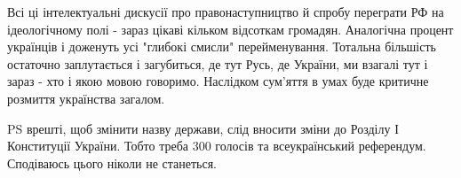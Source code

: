 Всі ці інтелектуальні дискусії про правонаступництво й спробу переграти РФ на
ідеологічному полі - зараз цікаві кільком відсоткам громадян. Аналогічна
процент українців і доженуть усі "глибокі смисли" перейменування. Тотальна
більшість остаточно заплутається і загубиться, де тут Русь, де України, ми
взагалі тут і зараз - хто і якою мовою говоримо. Наслідком сум'яття в умах буде
критичне розмиття українства загалом. 

PS врешті, щоб змінити назву держави, слід вносити зміни до Розділу І
Конституції України. Тобто треба 300 голосів та всеукраїнський референдум.
Сподіваюсь цього ніколи не станеться.


